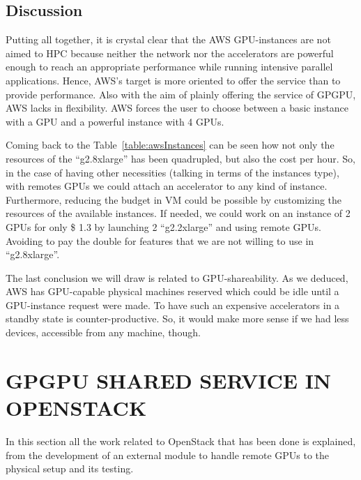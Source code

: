 \documentclass[a4paper,twoside]{article}
\begin{document}
\subsection{Discussion}
Putting all together,  it is crystal clear that the AWS GPU-instances are not aimed to HPC because neither the network nor the accelerators are powerful enough to reach an appropriate performance
while running intensive parallel applications. 
Hence, AWS's target is more oriented to offer the service than to provide performance.
Also with the aim of plainly offering the service of GPGPU, AWS lacks in flexibility. 
AWS forces the user to choose between a basic instance with a GPU and a powerful instance with 4 GPUs.

Coming back to the Table~\ref{table:awsInstances} can be seen how not only the resources of the ``g2.8xlarge'' has been quadrupled, but also the cost per hour.
So, in the case of having other necessities (talking in terms of the instances type), with remotes GPUs we could attach an accelerator to any kind of instance.
Furthermore, reducing the budget in VM could be possible by customizing the resources of the available instances.
If needed, we could work on an instance of 2 GPUs for only \$ 1.3 by launching 2 ``g2.2xlarge'' and using remote GPUs. 
Avoiding to pay the double for features that we are not willing to use in ``g2.8xlarge''.

The last conclusion we will draw is related to GPU-shareability. 
As we deduced, AWS has GPU-capable physical machines reserved which could be idle until a GPU-instance request were made.
To have such an expensive accelerators in a standby state is counter-productive. So, it would make more sense if we had less devices, accessible from any machine, though.

\section{\uppercase{GPGPU Shared Service in OpenStack}}
In this section all the work related to OpenStack that has been done is explained, from the development of an external module to handle remote GPUs to the physical setup and its testing.
\end{document}
